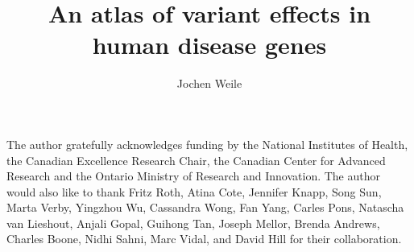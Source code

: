 \documentclass[12pt]{ut-thesis}
\author{Jochen Weile}
\title{An atlas of variant effects in human disease genes}
\begin{document}
\begin{preliminary}

\maketitle


\begin{abstract}

\end{abstract}



\begin{acknowledgements}
The author gratefully acknowledges funding by the National Institutes of Health, the Canadian Excellence Research Chair, the Canadian Center for Advanced Research and the Ontario Ministry of Research and Innovation. The author would also like to thank Fritz Roth, Atina Cote, Jennifer Knapp, Song Sun, Marta Verby, Yingzhou Wu, Cassandra Wong, Fan Yang, Carles Pons, Natascha van Lieshout, Anjali Gopal,  Guihong Tan, Joseph Mellor, Brenda Andrews, Charles Boone, Nidhi Sahni, Marc Vidal, and David Hill for their collaboration.
\end{acknowledgements}

\tableofcontents




\end{preliminary}






\end{document}

